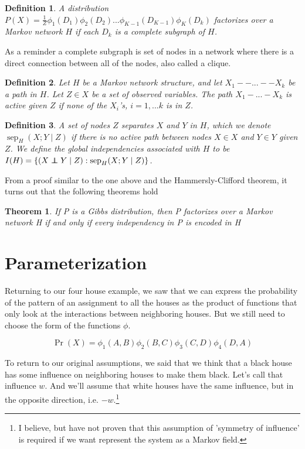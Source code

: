 \documentclass{article}
\newcommand\independent{\protect\mathpalette{\protect\independenT}{\perp}}
\def\independenT#1#2{\mathrel{\rlap{$#1#2$}\mkern2mu{#1#2}}}
\newtheorem{theorem}{Theorem}
\newtheorem{mydef}{Definition}
\begin{document}
\begin{mydef}
A distribution
$P(X)=\frac{1}{Z}\phi_1(D_1)\phi_2(D_2)...\phi_{K-1}(D_{K-1})\phi_K(D_k)$
factorizes over a Markov network $H$ if each $D_k$ is a complete
subgraph of $H$.
\end{mydef}

 As a reminder a complete subgraph is set of nodes in
a network where there is a direct connection between all of the nodes,
also called a clique.

\begin{mydef}
Let $H$ be a Markov network structure, and let $X_1--...--X_k$ be a
path in $H$. Let $Z \in X$ be a set of observed variables. The path
$X_1-...-X_k$ is active given $Z$ if none of the $X_i$'s, $i =
1,...k$ is in $Z$.
\end{mydef}

\begin{mydef}
A set of nodes $Z$ separates $X$ and $Y$ in $H$, which we denote
$\operatorname{sep}_H(X;Y \mid Z)$ if there is no active path between
nodes $X \in X$ and $Y \in Y$ given $Z$. We define the global
independencies associated with $H$ to be $I(H) = \left\{(X \independent Y \mid Z) : \operatorname{sep}_H(X;Y \mid Z)\right\}$.
\end{mydef}

From a proof similar to the one above and the Hammersly-Clifford
theorem, it turns out that the following theorems hold

\begin{theorem}
  If P is a Gibbs distribution, then P factorizes over a Markov network
H if and only if every independency in P is encoded in H
\end{theorem}

\section{Parameterization}
Returning to our four house example, we saw that we can express the
probability of the pattern of an assignment to all the houses as the
product of functions that only look at the interactions between
neighboring houses. But we still need to choose the form of the
functions $\phi$.

\begin{equation}
\Pr(X) = \phi_1(A,B)\phi_2(B,C)\phi_3(C,D)\phi_4(D,A) 
\end{equation}


 
To return to our original assumptions, we said that we think that a
black house has some influence on neighboring houses to make them
black. Let's call that influence $w$. And we'll assume that white
houses have the same influence, but in the opposite direction,
i.e. $-w$.\footnote{I believe, but have not proven that this
  assumption of 'symmetry of influence' is required if we want
  represent the system as a Markov field.}
\end{document}
